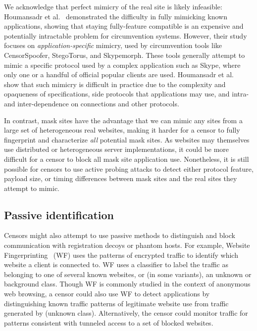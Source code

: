 \documentclass[sigconf]{acmart}
\begin{document}
We acknowledge that perfect mimicry of the real site is likely infeasible:
Houmansadr et al.~\cite{houmansadr-parrot} demonstrated the difficulty in fully
mimicking known applications, showing that staying fully-feature compatible is
an expensive and potentially intractable problem for circumvention systems.
However, their study focuses on \emph{application-specific} mimicry, used by
circumvention tools like CensorSpoofer, StegoTorus, and Skypemorph. These tools
generally attempt to mimic a specific protocol used by a complex application
such as Skype,
where only one or a handful of official popular clients are used. Houmansadr et
al.~\cite{houmansadr-parrot} show that such mimicry is difficult in practice due
to the complexity and opaqueness of specifications, side protocols that
applications may use, and intra- and inter-dependence on connections and other
protocols.

In contrast, mask sites have
the advantage that we can mimic any sites from a large set of heterogeneous real
websites, making it harder for a censor to fully fingerprint and characterize
\emph{all} potential mask sites. As websites may themselves use distributed
or heterogeneous server implementations, it could be more difficult for a
censor to block all mask site application use.
Nonetheless, it is still possible for censors to
use active probing attacks to detect either protocol feature, payload size, or
timing differences between mask sites and the real sites they attempt to mimic.


\subsection{Passive identification}
Censors might also attempt to use passive methods to distinguish and block communication
with registration decoys or phantom hosts. For example, 
Website Fingerprinting~\cite{wang2014effective,hayes2016k,sirinam2018deep} (WF)
uses the patterns of encrypted traffic to identify which website a client is
connected to. WF uses a classifier to label the traffic as belonging to one of
several known websites, or (in some variants), an unknown or background class.
Though WF is commonly studied in the context of anonymous web browsing, a censor
could also use WF to detect \scheme applications by distinguishing known traffic
patterns of legitimate website use from traffic generated by \scheme (unknown
class). Alternatively, the censor could monitor traffic for patterns consistent
with tunneled access to a set of blocked websites.
\end{document}
